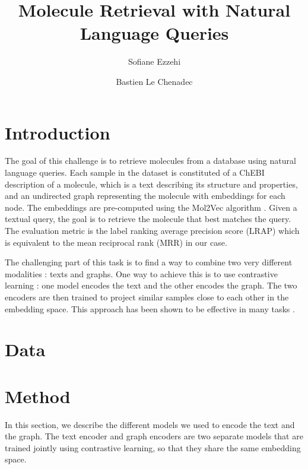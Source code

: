 \documentclass[switch, 12pt]{article}
\title{Molecule Retrieval with Natural Language Queries}
\author[1]{Sofiane Ezzehi}
\author[1]{Bastien Le Chenadec}
\affil[1]{École des Ponts ParisTech}
\begin{document}
\maketitle

\begin{contribstatement}

\end{contribstatement}
\vspace{0.35cm}

\begin{multicols}{2}
    \section{Introduction}

    The goal of this challenge is to retrieve molecules from a database using natural language queries. Each sample in the dataset is constituted of a ChEBI description of a molecule, which is a text describing its structure and properties, and an undirected graph representing the molecule with embeddings for each node. The embeddings are pre-computed using the Mol2Vec algorithm \cite{mol2vec}. Given a textual query, the goal is to retrieve the molecule that best matches the query. The evaluation metric is the label ranking average precision score (LRAP) which is equivalent to the mean reciprocal rank (MRR) in our case.

    The challenging part of this task is to find a way to combine two very different modalities : texts and graphs. One way to achieve this is to use contrastive learning : one model encodes the text and the other encodes the graph. The two encoders are then trained to project similar samples close to each other in the embedding space. This approach has been shown to be effective in many tasks \cite{chen-2020,gao-2021}.

    \section{Data}

    \section{Method}

    In this section, we describe the different models we used to encode the text and the graph. The text encoder and graph encoders are two separate models that are trained jointly using contrastive learning, so that they share the same embedding space.


\end{multicols}
\end{document}

